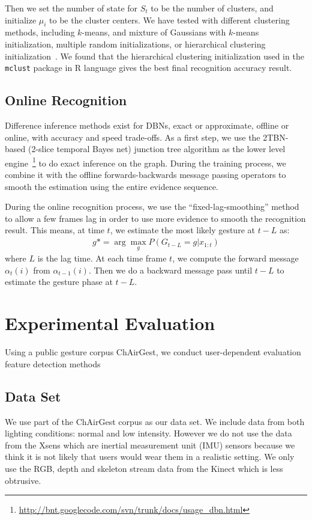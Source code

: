 \documentclass{sigchi}
\begin{document}
Then we set the number of state for $S_t$
to be the number of clusters, and initialize $\mu_i$ to be the cluster centers.
We have tested with different clustering methods, including $k$-means,
and mixture of Gaussians with $k$-means initialization, multiple random
initializations, or hierarchical clustering initialization~\cite{Fraley:2003}. We
found that the hierarchical clustering initialization used in the \texttt{mclust} package in R
language gives the best final recognition accuracy result.

\subsection{Online Recognition}
Difference inference methods exist for DBNs, exact or approximate, offline or
online, with accuracy and speed trade-offs. As a first step, we use the
2TBN-based (2-slice temporal Bayes net) junction tree algorithm as the lower
level 
engine~\footnote{\url{http://bnt.googlecode.com/svn/trunk/docs/usage_dbn.html}}
to do exact inference on the graph. During the training process, we combine it
with the offline forwards-backwards message passing operators to smooth the
estimation using the entire evidence sequence.

During the online recognition process, we use the ``fixed-lag-smoothing''
method~\cite{murphy02} to allow a few frames lag in order to use more evidence to smooth the recognition result. This means, at time $t$,  we estimate the most likely
gesture at $t - L$ as:
\begin{align}
g* = \arg\max_g P(G_{t-L} = g | x_{1:t})
\end{align}
where $L$ is the lag time. At each time frame $t$, we compute the forward
message $\alpha_t(i)$ from $\alpha_{t-1}(i)$. Then we do a backward message pass
until $t-L$ to estimate the gesture phase at $t - L$.

\section{Experimental Evaluation}
Using a public gesture corpus
ChAirGest\cite{Ruffieux2013}, 
we conduct user-dependent evaluation 
feature detection methods

\subsection{Data Set}
We use part of the ChAirGest corpus as our data set. We include data from
both lighting conditions: normal and low intensity. However we do not use the
data from the Xsens which are inertial measurement unit (IMU) sensors because we
think it is not likely that users would wear them in a realistic setting. We
only use the RGB, depth and skeleton stream data from the Kinect which is less
obtrusive.
\end{document}
